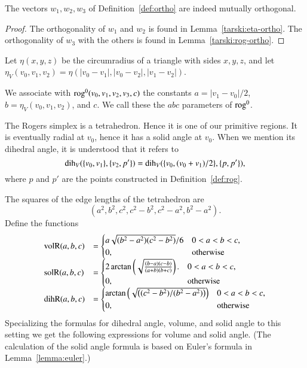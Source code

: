 \begin{lemma} The vectors $w_1,w_2,w_3$ of Definition~\ref{def:ortho}
are indeed mutually orthogonal.
\end{lemma}

\begin{proof} The orthogonality of $w_1$ and $w_2$ is found in
Lemma~\ref{tarski:eta-ortho}.  The orthogonality of $w_3$ with the
others is found in Lemma~\ref{tarski:rog-ortho}.
\end{proof}

\begin{definition}
Let $\eta(x,y,z)$ be the circumradius of a triangle with sides
$x,y,z$, and let $\eta_V(v_0,v_1,v_2) = \eta(|v_0-v_1|,|v_0-v_2|,|v_1-v_2|)$.
\end{definition}

\begin{definition}
We associate with ${\operatorname{rog}}^0(v_0,v_1,v_2,v_3,c)$ the constants
$a=|v_1-v_0|/2$, $b=\eta_V(v_0,v_1,v_2)$, and $c$.
We call these the $abc$ parameters of ${\operatorname{rog}}^0$. 
\end{definition}

The Rogers simplex is a tetrahedron.  Hence it is one of our
primitive regions.  It is eventually radial at $v_0$, hence
it has a solid angle at $v_0$.  When we mention its dihedral
angle, it is understood that it refers to 
   $$
   \operatorname{dih}_V(\{v_0,v_1\},\{v_2,p'\})=\operatorname{dih}_V(\{v_0,(v_0+v_1)/2\},\{p,p'\}),
   $$
where $p$ and $p'$ are the points 
constructed in Definition~\ref{def:rog}.

The squares of the edge lengths of the tetrahedron are
   $$
   (a^2,b^2,c^2,c^2-b^2,c^2-a^2,b^2-a^2).
   $$
Define the functions
   $$
   \begin{array}{lll}
     {\operatorname{volR}}(a,b,c) &= \begin{cases}
       a\sqrt{(b^2-a^2)(c^2-b^2)}/6& 0 < a < b < c,\\
       0,&\text{otherwise}
       \end{cases}\\
     {\operatorname{solR}}(a,b,c) &= \begin{cases}
      2 \arctan\left(\sqrt{\frac{(b-a) (c-b)}{(a+b)
   (b+c)}}\right).& 0 < a < b < c,\\
      0,&\text{otherwise}
     \end{cases}\\
     {\operatorname{dihR}}(a,b,c) &= \begin{cases}
      \arctan\left(\sqrt{\left((c^2 - b^2)/(b^2 - a^2)\right)}\right)
      & 0 < a < b < c,\\
      0,&\text{otherwise}
     \end{cases}
     \end{array}
   $$
Specializing the formulas for dihedral angle, volume, and solid angle to this
setting we get the following expressions for volume and solid angle.
(The calculation of the
 solid angle formula is based on Euler's formula in 
Lemma~\ref{lemma:euler}.)

